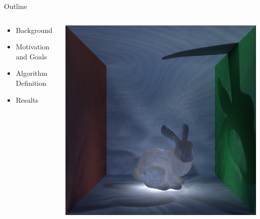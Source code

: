 \documentclass[10pt,compress,professionalfont]{beamer}
\begin{document}
\begin{frame}{Outline}

    \begin{columns}
        \begin{column}{0.5\textwidth}

            \vspace{-4mm}
            \begin{itemize}
                \item Background\\ \vspace{2mm}
                \item Motivation and Goals\\ \vspace{2mm}
                \item Algorithm Definition\\ \vspace{2mm}
                \item Results
            \end{itemize}
        \end{column}
        \begin{column}{0.5\textwidth}
            \includegraphics[width=\textwidth]{../img/bunny_glow}
        \end{column}
    \end{columns}

\end{frame}
\end{document}
